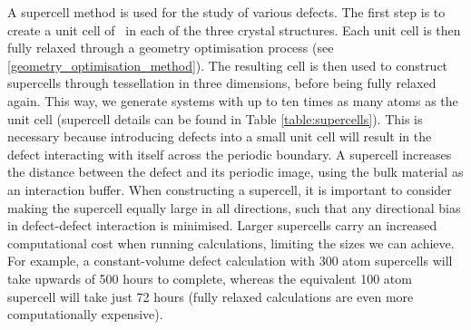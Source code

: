 A supercell method is used for the study of various defects. The first step is to create a unit cell of \zirconia\ in each of the three crystal structures. Each unit cell is then fully relaxed through a geometry optimisation process (see \ref{geometry_optimisation_method}). The resulting cell is then used to construct supercells through tessellation in three dimensions, before being fully relaxed again. This way, we generate systems with up to ten times as many atoms as the unit cell (supercell details can be found in Table \ref{table:supercells}). This is necessary because introducing defects into a small unit cell will result in the defect interacting with itself across the periodic boundary. A supercell increases the distance between the defect and its periodic image, using the bulk material as an interaction buffer. When constructing a supercell, it is important to consider making the supercell equally large in all directions, such that any directional bias in defect-defect interaction is minimised. Larger supercells carry an increased computational cost when running calculations, limiting the sizes we can achieve. For example, a constant-volume defect calculation with 300 atom supercells will take upwards of 500 hours to complete, whereas the equivalent 100 atom supercell will take just 72 hours (fully relaxed calculations are even more computationally expensive).


